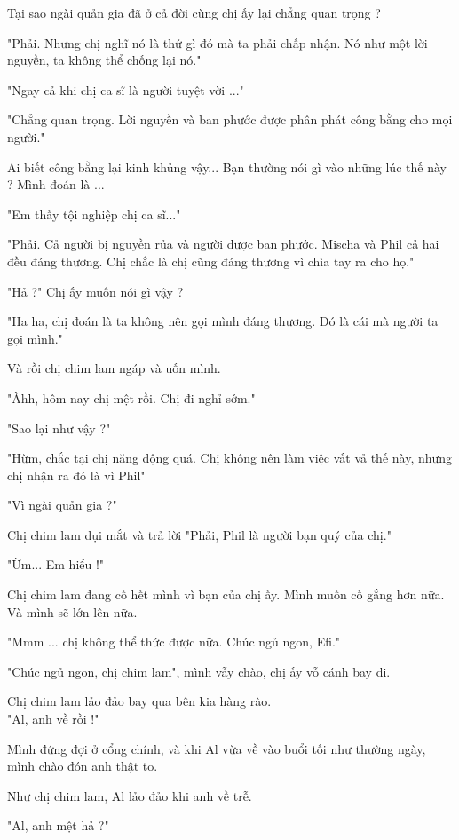  Tại sao ngài quản gia đã ở cả đời cùng chị ấy lại chẳng quan trọng ?
 
 "Phải. Nhưng chị nghĩ nó là thứ gì đó mà ta phải chấp nhận. Nó như một lời nguyền, ta không thể chống lại nó."
 
 "Ngay cả khi chị ca sĩ là người tuyệt vời ..."
 
 "Chẳng quan trọng. Lời nguyền và ban phước được phân phát công bằng cho mọi người."
 
 Ai biết công bằng lại kinh khủng vậy... Bạn thường nói gì vào những lúc thế này ? Mình đoán là ... 
 
 "Em thấy tội nghiệp chị ca sĩ..."
 
 "Phải. Cả người bị nguyền rủa và người được ban phước. Mischa và Phil cả hai đều đáng thương. Chị chắc là chị cũng đáng thương vì chìa tay ra cho họ."
 
 "Hả ?" Chị ấy muốn nói gì vậy ?
 
 "Ha ha, chị đoán là ta không nên gọi mình đáng thương. Đó là cái mà người ta gọi mình."
 
 Và rồi chị chim lam ngáp và uốn mình.

 "Àhh, hôm nay chị mệt rồi. Chị đi nghỉ sớm."
 
 "Sao lại như vậy ?"
 
 "Hừm, chắc tại chị năng động quá. Chị không nên làm việc vất vả thế này, nhưng chị nhận ra đó là vì Phil"
 
 "Vì ngài quản gia ?"
 
 Chị chim lam dụi mắt và trả lời "Phải, Phil là người bạn quý của chị." 
 
 "Ừm... Em hiểu !"
 
 Chị chim lam đang cố hết mình vì bạn của chị ấy. Mình muốn cố gắng hơn nữa. Và mình sẽ lớn lên nữa.
 
 "Mmm ... chị không thể thức được nữa. Chúc ngủ ngon, Efi."
 
 "Chúc ngủ ngon, chị chim lam", mình vẫy chào, chị ấy vỗ cánh bay đi.
 
 Chị chim lam lảo đảo bay qua bên kia hàng rào. \\
 
 
 "Al, anh về rồi !"
 
 Mình đứng đợi ở cổng chính, và khi Al vừa về vào buổi tối như thường ngày, mình chào đón anh thật to.
 
 Như chị chim lam, Al lảo đảo khi anh về trễ.
 
 "Al, anh mệt hả ?"
 
